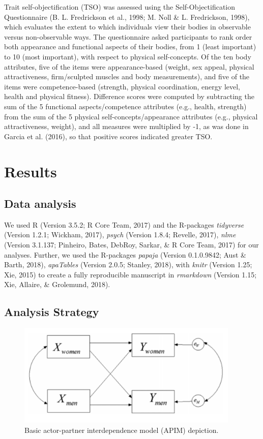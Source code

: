 \documentclass[man]{apa6}
\begin{document}
Trait self-objectification (TSO) was assessed using the
Self-Objectification Questionnaire (B. L. Fredrickson et al., 1998; M.
Noll \& L. Fredrickson, 1998), which evaluates the extent to which
individuals view their bodies in observable versus non-observable ways.
The questionnaire asked participants to rank order both appearance and
functional aspects of their bodies, from 1 (least important) to 10 (most
important), with respect to physical self-concepts. Of the ten body
attributes, five of the items were appearance-based (weight, sex appeal,
physical attractiveness, firm/sculpted muscles and body measurements),
and five of the items were competence-based (strength, physical
coordination, energy level, health and physical fitness). Difference
scores were computed by subtracting the sum of the 5 functional
aspects/competence attributes (e.g., health, strength) from the sum of
the 5 physical self-concepts/appearance attributes (e.g., physical
attractiveness, weight), and all measures were multiplied by -1, as was
done in Garcia et al. (2016), so that positive scores indicated greater
TSO.

\section{Results}\label{results}

\subsection{Data analysis}\label{data-analysis}

We used R (Version 3.5.2; R Core Team, 2017) and the R-packages
\emph{tidyverse} (Version 1.2.1; Wickham, 2017), \emph{psych} (Version
1.8.4; Revelle, 2017), \emph{nlme} (Version 3.1.137; Pinheiro, Bates,
DebRoy, Sarkar, \& R Core Team, 2017) for our analyses. Further, we used
the R-packages \emph{papaja} (Version 0.1.0.9842; Aust \& Barth, 2018),
\emph{apaTables} (Version 2.0.5; Stanley, 2018), with \emph{knitr}
(Version 1.25; Xie, 2015) to create a fully reproducible manuscript in
\emph{rmarkdown} (Version 1.15; Xie, Allaire, \& Grolemund, 2018).

\subsection{Analysis Strategy}\label{analysis-strategy}

\begin{figure}
\includegraphics[width=400px]{APIM_figure} \caption{Basic actor-partner interdependence model (APIM) depiction.}\label{fig:apim}
\end{figure}
\end{document}
